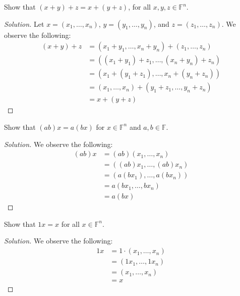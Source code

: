 \documentclass[openany]{book}
\newenvironment{solution}{\begin{proof}[Solution]}{\end{proof}}
\begin{document}
	\begin{hw}
		Show that $(x+y)+z = x+(y+z)$, for all $x,y,z \in \mathbb{F}^{n}$.
	\end{hw}
	\begin{solution}
		Let $x = (x_{1}, \ldots, x_{n})$, $y = (y_{1}, \ldots, y_{n})$, and $z = (z_{1}, \ldots, z_{n})$. We observe the following:
		\begin{align*}
			(x+y) + z &= (x_{1} + y_{1}, \ldots, x_{n} + y_{n}) + (z_{1}, \ldots, z_{n}) \\
			&= ( (x_{1} + y_{1}) + z_{1}, \ldots, (x_{n} + y_{n}) + z_{n} ) \\
			&= ( x_{1} + (y_{1} + z_{1}), \ldots, x_{n} + (y_{n} + z_{n})) \\
			&= (x_{1}, \ldots, x_{n}) + (y_{1} + z_{1}, \ldots, y_{n} + z_{n}) \\
			&= x + (y+z)
		\end{align*}
	\end{solution}

	\begin{hw}
		Show that $(ab)x = a(bx)$ for $x \in \mathbb{F}^{n}$ and $a,b \in \mathbb{F}$.
	\end{hw}
	\begin{solution}
		We observe the following:
		\begin{align*}
			(ab)x &= (ab)(x_{1}, \ldots, x_{n}) \\
			&= ( (ab)x_{1}, \ldots, (ab) x_{n}) \\
			&= ( a (bx_{1}), \ldots, a (bx_{n})) \\
			&= a (bx_{1}, \ldots, bx_{n}) \\
			&= a (bx)
		\end{align*}
	\end{solution}

	\begin{hw}
		Show that $1x = x$ for all $x \in \mathbb{F}^{n}$.
	\end{hw}
	\begin{solution}
		We observe the following:
		\begin{align*}
			1x &= 1 \cdot (x_{1}, \ldots, x_{n}) \\
			&= (1x_{1}, \ldots, 1x_{n}) \\
			&= (x_{1}, \ldots, x_{n}) \\
			&= x
		\end{align*}
	\end{solution}
\end{document}
